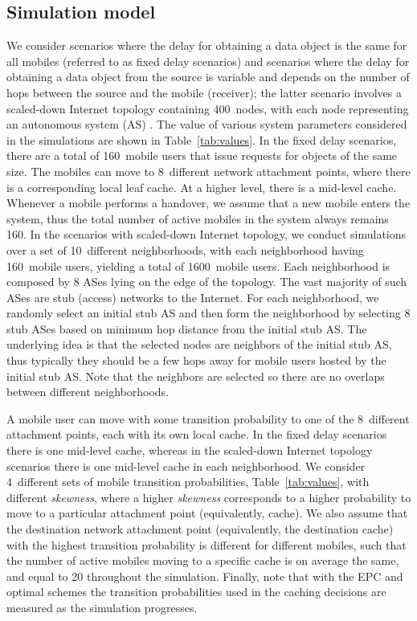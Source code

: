 \documentclass[conference]{IEEEtran}
\begin{document}
\vspace{-0.06in}
\subsection{Simulation model}
\vspace{-0.03in}

We consider scenarios where the delay for obtaining a data object is the same for all mobiles (referred to as fixed delay scenarios) and scenarios where the delay for obtaining a data object from the source is variable and depends on the number of hops between the source and the mobile  (receiver); the latter scenario involves a scaled-down Internet topology containing 400~nodes,  with each node representing an autonomous system (AS) \cite{dimitropoulos}.
The value of various system parameters considered in the simulations are shown in Table~\ref{tab:values}.
In the fixed delay scenarios, there are a total of  160~mobile users that issue requests for objects of the same size. The mobiles can move to 8~different network attachment points, where there is a corresponding local leaf cache. At a higher level, there is a mid-level cache. Whenever a mobile performs a handover, we assume that a new mobile enters the system, thus the total number of active mobiles in the system always remains 160.
In the  scenarios with scaled-down Internet topology, we conduct simulations over a set of 10~different neighborhoods, with each neighborhood having 160~mobile users, yielding a total of 1600~mobile users.
Each neighborhood is composed by 8 ASes lying on the edge of the topology. The vast majority of such ASes are stub (access) networks to the Internet. For each neighborhood, we randomly select an initial stub AS and then form the neighborhood by selecting 8 stub ASes based on minimum hop distance from the initial stub AS. The underlying idea is that the selected nodes are neighbors of the initial stub AS, thus typically they should be a few hops away for mobile users  hosted by the initial stub AS. Note that the neighbors are selected so there are no overlaps between different neighborhoods.

A mobile user can move with some transition probability to one of the 8~different attachment points, each with its own local cache. In the fixed delay scenarios there is one mid-level cache, whereas in the scaled-down Internet topology scenarios there is one mid-level cache in each neighborhood.
We consider 4~different sets of mobile transition probabilities, Table~\ref{tab:values}, with different \emph{skewness}, where a higher \emph{skewness} corresponds to a higher probability to move to a particular attachment point (equivalently, cache).
We also assume that the destination network attachment point (equivalently, the destination cache) with the highest transition probability is different for different mobiles, such that the number of active mobiles moving to a specific cache is on average the same, and equal to 20 throughout the simulation.
Finally, note that with the EPC and optimal schemes the transition probabilities used in the caching decisions are measured as the  simulation progresses.
\end{document}
